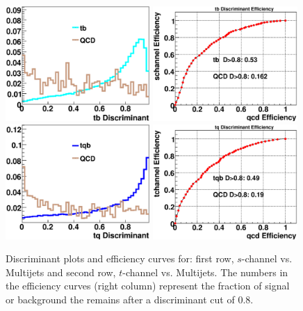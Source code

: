 \begin{figure}[!h!tbp]
\includegraphics[width=0.49\textwidth]
{eps/MatrixElement/performance/tb_Discriminant__schannel_qcd}
\includegraphics[width=0.49\textwidth]
{eps/MatrixElement/performance/tb_Efficiency__schannel_qcd}
\includegraphics[width=0.49\textwidth]
{eps/MatrixElement/performance/tq_Discriminant__tchannel_qcd}
\includegraphics[width=0.49\textwidth]
{eps/MatrixElement/performance/tq_Efficiency__tchannel_qcd}
\caption{Discriminant plots and efficiency curves for:
first row, $s$-channel vs. Multijets and second row, $t$-channel
vs. Multijets. The numbers in the
efficiency curves (right column) represent the fraction of signal or
background the remains after a discriminant cut of 0.8.}
\label{disc_qcd}
\end{figure}

